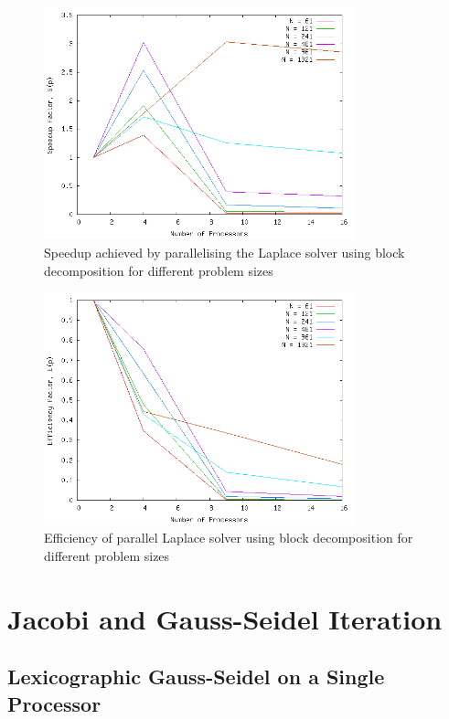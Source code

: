 \documentclass{article}
\begin{document}
\begin{figure}
	\centering
	\includegraphics[width=0.8\textwidth]{task3/task3_block_speedups.png}
	\caption{Speedup achieved by parallelising the Laplace solver using block decomposition for different problem sizes}
	\label{fig:block_decomposition_speedup_factors}
\end{figure}

\begin{figure}
	\centering
	\includegraphics[width=0.8\textwidth]{task3/task3_block_efficiencies.png}
	\caption{Efficiency of parallel Laplace solver using block decomposition for different problem sizes}
	\label{fig:block_decomposition_efficiency_factors}
\end{figure}

\section{Jacobi and Gauss-Seidel Iteration}

\subsection{Lexicographic Gauss-Seidel on a Single Processor}
\end{document}
